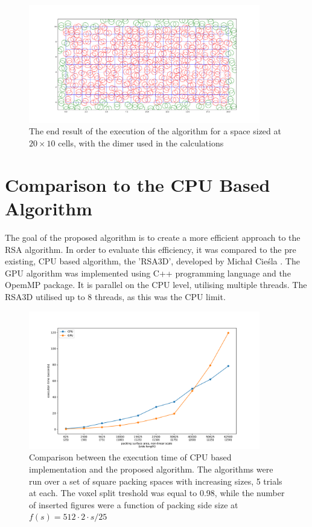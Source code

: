 \documentclass[12pt, oneside]{report}
\begin{document}
\begin{figure}[H]
  \centering
	\includegraphics[width=0.9\textwidth,keepaspectratio]{Images/SummaryOptimisation/dimer_ready.pdf}
	\caption{The end result of the execution of the algorithm for a space sized at $20 \times 10$ cells, with the dimer used in the calculations}
	\label{summary_dimer_ready}
\end{figure}

\section{Comparison to the CPU Based Algorithm}

The goal of the proposed algorithm is to create a more efficient approach to the RSA algorithm. In order to evaluate this efficiency, it was compared to the pre existing, CPU based algorithm, the 'RSA3D', developed by Michał Cieśla \cite{ciesla}. The GPU algorithm was implemented using C++ programming language and the OpemMP package. It is parallel on the CPU level, utilising multiple threads. The RSA3D utilised up to 8 threads, as this was the CPU limit. \newline


\begin{figure}[H]
  \centering
	\includegraphics[width=0.9\textwidth,keepaspectratio]{Images/SummaryComparison/basic_comparison.pdf}
	\caption{Comparison between the execution time of CPU based implementation and the proposed algorithm. The algorithms were run over a set of square packing spaces with increasing sizes, 5 trials at each. The voxel split treshold was equal to 0.98, while the number of inserted figures were a function of packing side size at $f(s) = 512 \cdot 2 \cdot s/25 $ }
	\label{summary_comparison}
\end{figure}
\end{document}
